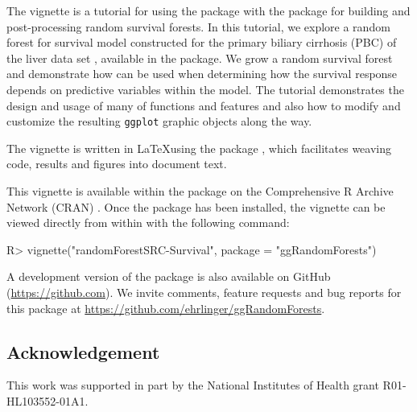 \documentclass[article, nojss]{jss}
\begin{document}
The vignette is a tutorial for using the  package
with the  package for building and post-processing
random survival forests. In this tutorial, we explore a random forest
for survival model constructed for the primary biliary cirrhosis (PBC)
of the liver data set \citep{fleming:1991}, available in the
 package. We grow a random survival forest and
demonstrate how  can be used when determining how
the survival response depends on predictive variables within the model.
The tutorial demonstrates the design and usage of many of
 functions and features and also how to modify and
customize the resulting \texttt{ggplot} graphic objects along the way.

The vignette is written in \LaTeX using the  package
\citep[\url{http://CRAN.R-project.org/package=knitr}]{Xie:2015, Xie:2014,Xie:2013},
which facilitates weaving  \citep{rcore} code, results and
figures into document text.

This vignette is available within the  package on
the Comprehensive R Archive Network (CRAN)
\citep[\url{http://cran.r-project.org}]{rcore}. Once the package has
been installed, the vignette can be viewed directly from within
 with the following command:

\begin{Schunk}
\begin{Sinput}
R> vignette("randomForestSRC-Survival", package = "ggRandomForests")
\end{Sinput}
\end{Schunk}

A development version of the  package is also
available on GitHub (\url{https://github.com}). We invite comments,
feature requests and bug reports for this package at
\url{https://github.com/ehrlinger/ggRandomForests}.

\subsection{Acknowledgement}\label{acknowledgement}

This work was supported in part by the National Institutes of Health
grant R01-HL103552-01A1.

\renewcommand\refname{References}

\end{document}
